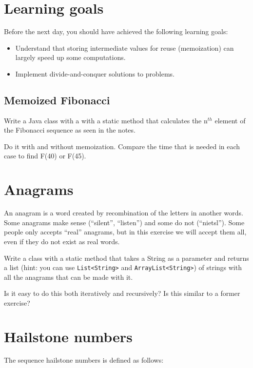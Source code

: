 \documentclass{article}
\begin{document}
\section*{Learning goals}
\label{sec:learning-goals}

Before the next day, you should have achieved the following learning
goals: 

\begin{itemize}
\item Understand that storing intermediate values for reuse
  (memoization) can largely speed up some computations. 
\item Implement divide-and-conquer solutions to problems. 
\end{itemize}

\subsection{Memoized Fibonacci}

Write a Java class with a with a static method that calculates 
the n$^{th}$ element of the Fibonacci sequence as seen in the notes.

Do it with and without memoization. Compare
the time that is needed in each case to find F(40) or F(45). 

\section{Anagrams}
\label{sec:anagrams}

An anagram is a word created by recombination of the letters in
another words. Some anagrams make sense (``silent'', ``listen'') and
some do not (``nietsl''). Some people only accepts ``real'' anagrams,
but in this exercise we will accept them all, even if they do not
exist as real words. 

Write a class with a static method that takes a String as a parameter
and returns a list (hint: you can use \verb+List<String>+ and
\verb+ArrayList<String>+) of strings with all the anagrams that can be
made with it. 

Is it easy to do this both iteratively and recursively? Is this
similar to a former exercise?

\section{Hailstone numbers}
\label{sec:hailstone-numbers}

The sequence hailstone numbers is defined as follows:
\end{document}
